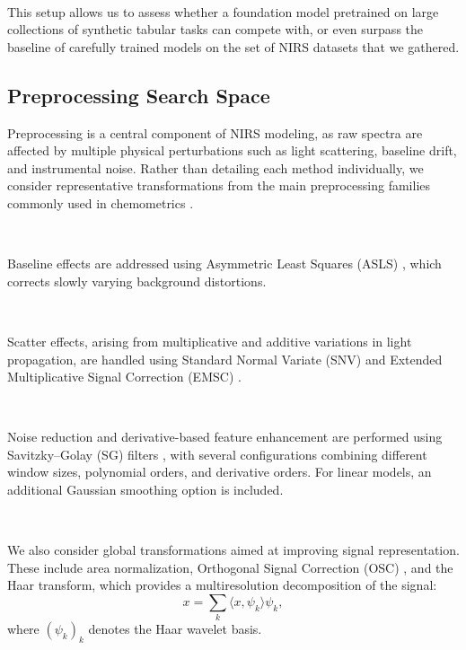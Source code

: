 \documentclass{article}
\begin{document}
~

This setup allows us to assess whether a foundation model pretrained on large collections of synthetic tabular tasks can compete with, or even surpass the baseline of carefully trained models on the set of NIRS datasets that we gathered.





\subsection{Preprocessing Search Space} \label{preprocs}

Preprocessing is a central component of NIRS modeling, as raw spectra are affected by multiple physical perturbations such as light scattering, baseline drift, and instrumental noise. Rather than detailing each method individually, we consider representative transformations from the main preprocessing families commonly used in chemometrics \cite{Rinnan2009Preprocessing}.

~

Baseline effects are addressed using Asymmetric Least Squares (ASLS) \cite{eilers_baseline_2005}, which corrects slowly varying background distortions.

~

Scatter effects, arising from multiplicative and additive variations in light propagation, are handled using Standard Normal Variate (SNV) \cite{barnes_standard_1989} and Extended Multiplicative Signal Correction (EMSC) \cite{Martens1991EMSC}.

~

Noise reduction and derivative-based feature enhancement are performed using Savitzky--Golay (SG) filters \cite{Savitzky1964SG}, with several configurations combining different window sizes, polynomial orders, and derivative orders. For linear models, an additional Gaussian smoothing option is included.

~

We also consider global transformations aimed at improving signal representation. These include area normalization, Orthogonal Signal Correction (OSC) \cite{wold_orthogonal_1998}, and the Haar transform, which provides a multiresolution decomposition of the signal:
\begin{equation}
x = \sum_{k} \langle x, \psi_k \rangle \psi_k,
\end{equation}
where $(\psi_k)_k$ denotes the Haar wavelet basis.

~
\end{document}

